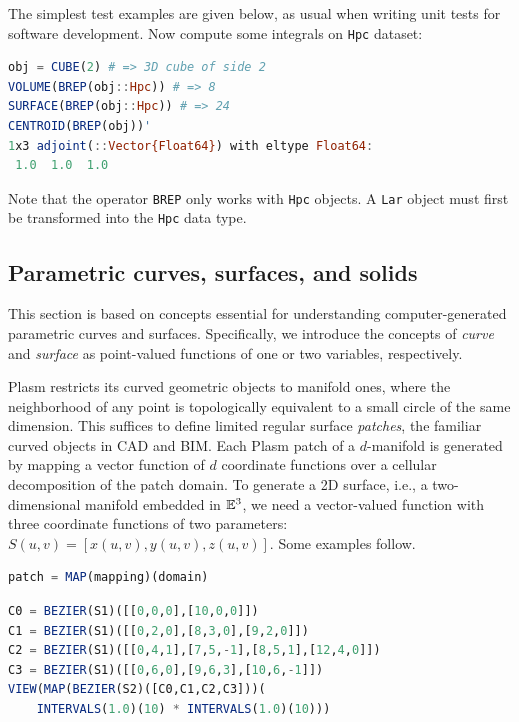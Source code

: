 \documentclass{juliacon}
\begin{document}
The simplest test examples are given below, as usual when writing unit tests for software development.
Now compute some integrals on {\tt Hpc} dataset:
\begin{lstlisting}[language = Julia,numbers=none,label={lst:exmpl10},
caption={Simple test examples of the integration module {\tt Plasm/src/integr/}: volume, surface, and centroid tests.}
]
obj = CUBE(2) # => 3D cube of side 2
VOLUME(BREP(obj::Hpc)) # => 8
SURFACE(BREP(obj::Hpc)) # => 24
CENTROID(BREP(obj))' 
1x3 adjoint(::Vector{Float64}) with eltype Float64:
 1.0  1.0  1.0
\end{lstlisting}
Note that the operator {\tt BREP} only works with {\tt Hpc} objects. A {\tt Lar} object must first be transformed into the {\tt Hpc} data type. 




\subsection{Parametric curves, surfaces, and solids}
\label{subsec:title_auth}

This section is based on concepts essential for understanding computer-generated parametric
curves and surfaces. Specifically, we introduce the concepts of \emph{curve} and \emph{surface} as point-valued functions of one or two variables, respectively. 

Plasm restricts its curved geometric objects to manifold ones, where the neighborhood of any point is topologically equivalent to a small circle of the same dimension. This suffices to define limited regular surface \emph{patches}, the familiar curved objects in CAD and BIM. Each Plasm patch of a $d$-manifold is generated by mapping a vector function of $d$ coordinate functions over a cellular decomposition of the patch domain. To generate a 2D surface, i.e., a two-dimensional manifold embedded in $\mathbb{E}^3$, we need a vector-valued function with three coordinate functions of two parameters: $S(u,v) = [x(u,v), y(u,v), z(u,v)]$.
Some examples follow.

\begin{lstlisting}[language = Julia,numbers=none,label={lst:exmpl10},
caption={Symbolic example of Plasm-generated manifold patch. Of course, this coding structure may be modified when useful to produce a simpler user interface.}
]
patch = MAP(mapping)(domain)
\end{lstlisting}

\vspace{-5mm}
\begin{lstlisting}[language = Julia,numbers=none,label={lst:exmpl10},
caption={Transfinite Bézier patch defined by four Bézier curves. The corresponding surface patch is shown in Figure \ref{}. Note that the argument Bézier functions may have any degree.}
]
C0 = BEZIER(S1)([[0,0,0],[10,0,0]])
C1 = BEZIER(S1)([[0,2,0],[8,3,0],[9,2,0]])
C2 = BEZIER(S1)([[0,4,1],[7,5,-1],[8,5,1],[12,4,0]])
C3 = BEZIER(S1)([[0,6,0],[9,6,3],[10,6,-1]])
VIEW(MAP(BEZIER(S2)([C0,C1,C2,C3]))(
 	INTERVALS(1.0)(10) * INTERVALS(1.0)(10)))
\end{lstlisting}
\end{document}
